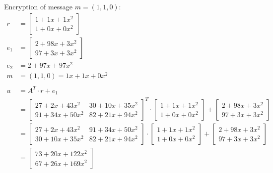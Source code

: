 Encryption of message $m=(1,1,0)$:
\begin{align*}
  r       & = \begin{bmatrix}1+1x+1x^2 \\ 1+0x+0x^2 \end{bmatrix}                                       \\
  e_1     & = \begin{bmatrix}2+98x+3x^2 \\ 97+3x+3x^2 \end{bmatrix}                                     \\
  e_2     & = 2+97x+97x^2                                                                               \\
  m       & =(1,1,0) = 1x+1x+0x^2                                                                       \\
  \\
  u       & = A^T \cdot r + e_1                                                                         \\
          & = \begin{bmatrix}27+2x+43x^2 & 30+10x+35x^2 \\ 91+34x+50x^2 & 82+21x+94x^2 \end{bmatrix}^T
  \cdot
  \begin{bmatrix}1+1x+1x^2 \\ 1+0x+0x^2 \end{bmatrix}
  +
  \begin{bmatrix}2+98x+3x^2 \\ 97+3x+3x^2 \end{bmatrix}                                                 \\
          & = \begin{bmatrix}27+2x+43x^2 & 91+34x+50x^2 \\ 30+10x+35x^2  & 82+21x+94x^2 \end{bmatrix}
  \cdot
  \begin{bmatrix}1+1x+1x^2 \\ 1+0x+0x^2 \end{bmatrix}
  +
  \begin{bmatrix}2+98x+3x^2 \\ 97+3x+3x^2 \end{bmatrix}                                                 \\
          & = \begin{bmatrix}73+20x+122x^2 \\ 67+26x+169x^2 \end{bmatrix}

\end{align*}
